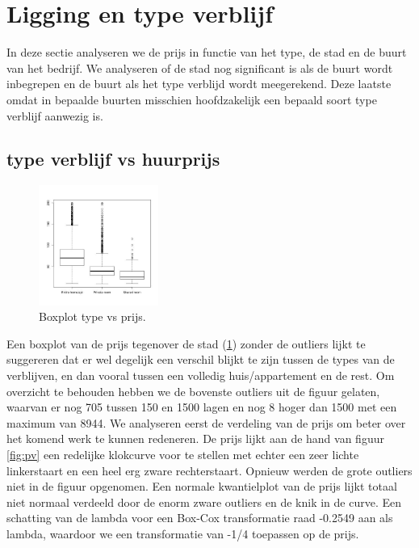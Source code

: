 \documentclass[a4paper,kulak]{kulakarticle} %
\begin{document}
\section{Ligging en type verblijf}
In deze sectie analyseren we de prijs in functie van het type, de stad en de buurt van het bedrijf.
We analyseren of de stad nog significant is als de buurt wordt inbegrepen en de buurt als het type verblijd wordt meegerekend.
Deze laatste omdat in bepaalde buurten misschien hoofdzakelijk een bepaald soort type verblijf aanwezig is.
\subsection{type verblijf vs huurprijs} \label{sec:pt}
\begin{figure}
	\begin{center}
		\includegraphics[width=0.35\textwidth]{boxplotPrijsCity.jpg}
	\end{center}
	\caption{Boxplot type vs prijs.}
	\label{fig:bpc}
\end{figure}
Een boxplot van de prijs tegenover de stad (\ref{fig:bpc}) zonder de outliers lijkt te suggereren  dat er wel degelijk een verschil blijkt te zijn tussen de types van de verblijven, en dan vooral tussen een volledig huis/appartement en de rest.
Om overzicht te behouden hebben we de bovenste outliers uit de figuur gelaten, waarvan er nog 705 tussen 150 en 1500 lagen en nog 8 hoger dan 1500 met een maximum van 8944. 
We analyseren eerst de verdeling van de prijs om beter over het komend werk te kunnen redeneren.
De prijs lijkt aan de hand van figuur \ref{fig:pv} een redelijke klokcurve voor te stellen met echter een zeer lichte linkerstaart en een heel erg zware rechterstaart. 
Opnieuw werden de grote outliers niet in de figuur opgenomen.
Een normale kwantielplot van de prijs lijkt totaal niet normaal verdeeld door de enorm zware outliers en de knik in de curve. 
Een schatting van de lambda voor een Box-Cox transformatie raad -0.2549 aan als lambda, waardoor we een transformatie van -1/4 toepassen op de prijs.
\end{document}
